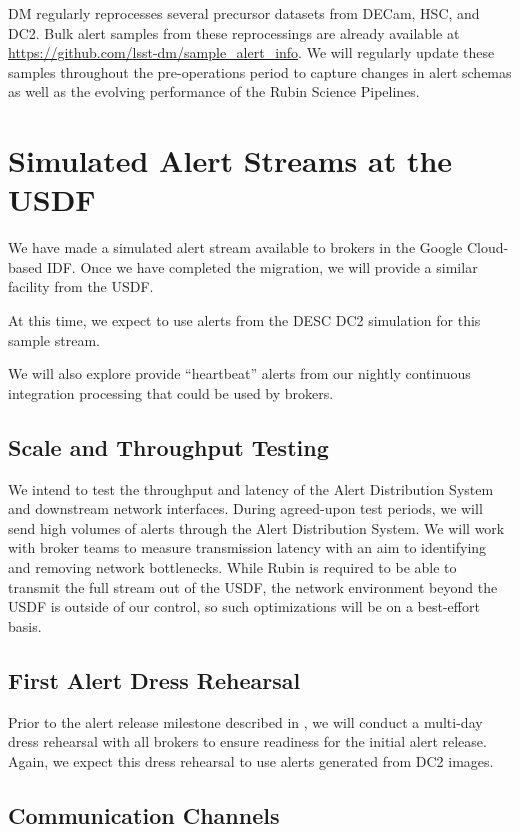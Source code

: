 \documentclass[DM,authoryear,toc]{lsstdoc}
\begin{document}
DM regularly reprocesses several precursor datasets from DECam, HSC, and DC2.
Bulk alert samples from these reprocessings are already available at \url{https://github.com/lsst-dm/sample_alert_info}.
We will regularly update these samples throughout the pre-operations period to capture changes in alert schemas as well as the evolving performance of the Rubin Science Pipelines.

\section{Simulated Alert Streams at the USDF}

We have made a simulated alert stream available to brokers in the Google Cloud-based IDF.
Once we have completed the migration, we will provide a similar facility from the USDF.

At this time, we expect to use alerts from the DESC DC2 simulation for this sample stream.

We will also explore provide ``heartbeat'' alerts from our nightly continuous integration processing that could be used by brokers.

\subsection{Scale and Throughput Testing}

We intend to test the throughput and latency of the Alert Distribution System and downstream network interfaces.
During agreed-upon test periods, we will send high volumes of alerts through the Alert Distribution System.
We will work with broker teams to measure transmission latency with an aim to identifying and removing network bottlenecks.
While Rubin is required to be able to transmit the full stream out of the USDF, the network environment beyond the USDF is outside of our control, so such optimizations will be on a best-effort basis.

\subsection{First Alert Dress Rehearsal}

Prior to the alert release milestone described in , we will conduct a multi-day dress rehearsal with all brokers to ensure readiness for the initial alert release.  
Again, we expect this dress rehearsal to use alerts generated from DC2 images.

\subsection{Communication Channels}
\end{document}
